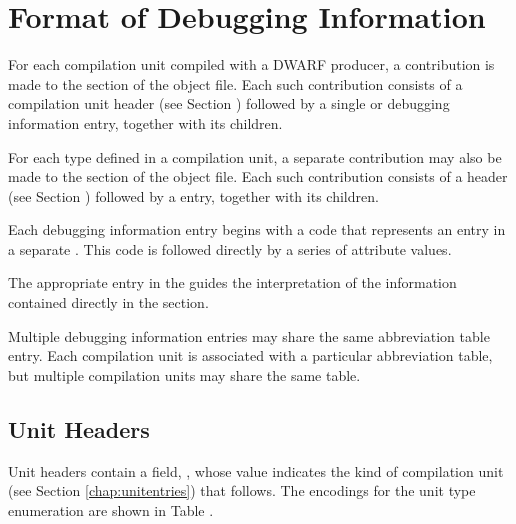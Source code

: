 \section{Format of Debugging Information}
\label{datarep:formatofdebugginginformation}

For each compilation unit compiled with a DWARF producer,
a contribution is made to the \dotdebuginfo{} section of
the object file. Each such contribution consists of a
compilation unit header 
(see Section ) 
followed by a
single \DWTAGcompileunit{} or 
\DWTAGpartialunit{} debugging
information entry, together with its children.

For each type defined in a compilation unit, a separate
contribution may also be made to the 
\dotdebuginfo{} 
section of the object file. Each
such contribution consists of a 
 header 
(see Section ) 
followed by a \DWTAGtypeunit{} entry, together with
its children.

Each debugging information entry begins with a code that
represents an entry in a separate 
. This
code is followed directly by a series of attribute values.

The appropriate entry in the 
 guides the
interpretation of the information contained directly in the
\dotdebuginfo{} section.

Multiple debugging information entries may share the same
abbreviation table entry. Each compilation unit is associated
with a particular abbreviation table, but multiple compilation
units may share the same table.

\subsection{Unit Headers}
\label{datarep:unitheaders}
Unit headers contain a field, , whose value indicates the kind of
compilation unit 
\bb
(see Section \ref{chap:unitentries})
\eb
that follows. The encodings for the unit type 
enumeration are shown in Table .

